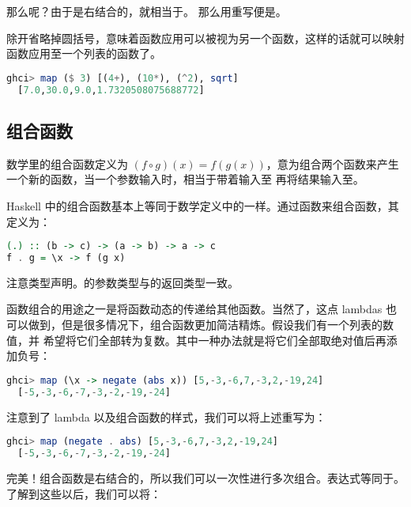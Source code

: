\documentclass[./main.tex]{subfiles}
\begin{document}
那么呢？由于\acode{\$}是右结合的，就相当于。
那么用\acode{\$}重写便是。

除开省略掉圆括号，\acode{\$}意味着函数应用可以被视为另一个函数，这样的话就可以映射函数应用至一个列表的函数了。

\begin{lstlisting}[language=Haskell]
  ghci> map ($ 3) [(4+), (10*), (^2), sqrt]
  [7.0,30.0,9.0,1.7320508075688772]
\end{lstlisting}

\subsection*{组合函数}

数学里的组合函数定义为 $(f \circ g)(x) = f(g(x))$，意为组合两个函数来产生一个新的函数，当一个参数输入时，相当于带着输入至
再将结果输入至。

Haskell 中的组合函数基本上等同于数学定义中的一样。通过函数来组合函数，其定义为：

\begin{lstlisting}[language=Haskell]
(.) :: (b -> c) -> (a -> b) -> a -> c
f . g = \x -> f (g x)
\end{lstlisting}

注意类型声明。的参数类型与的返回类型一致。

函数组合的用途之一是将函数动态的传递给其他函数。当然了，这点 lambdas 也可以做到，但是很多情况下，组合函数更加简洁精炼。假设我们有一个列表的数值，并
希望将它们全部转为复数。其中一种办法就是将它们全部取绝对值后再添加负号：

\begin{lstlisting}[language=Haskell]
  ghci> map (\x -> negate (abs x)) [5,-3,-6,7,-3,2,-19,24]
  [-5,-3,-6,-7,-3,-2,-19,-24]
\end{lstlisting}

注意到了 lambda 以及组合函数的样式，我们可以将上述重写为：

\begin{lstlisting}[language=Haskell]
  ghci> map (negate . abs) [5,-3,-6,7,-3,2,-19,24]
  [-5,-3,-6,-7,-3,-2,-19,-24]
\end{lstlisting}

完美！组合函数是右结合的，所以我们可以一次性进行多次组合。表达式等同于。了解到这些以后，我们可以将：
\end{document}
